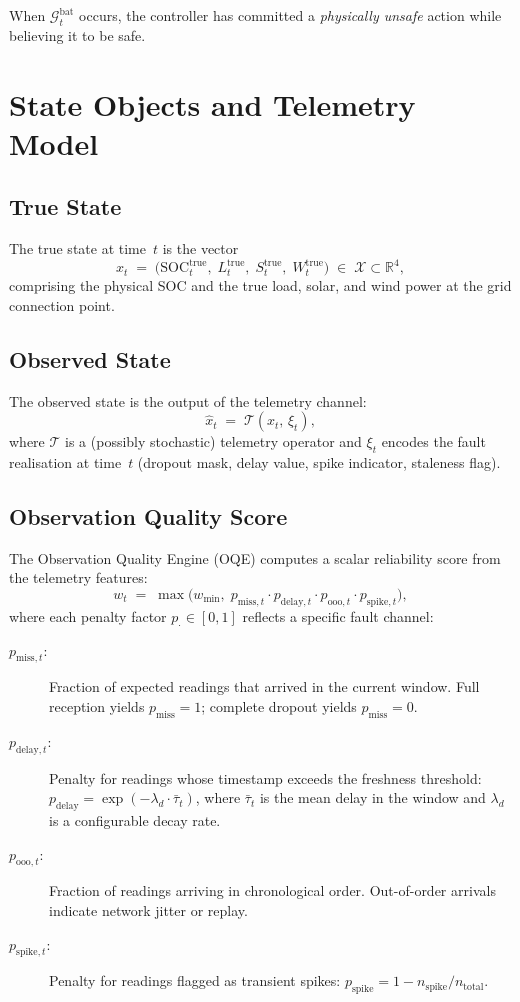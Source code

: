 When $\mathcal{G}_t^{\mathrm{bat}}$ occurs, the controller has committed
a \emph{physically unsafe} action while believing it to be safe.

\section{State Objects and Telemetry Model}

\subsection{True State}

The true state at time~$t$ is the vector
\[
  x_t \;=\; \bigl(\mathrm{SOC}_t^{\mathrm{true}},\;
  L_t^{\mathrm{true}},\; S_t^{\mathrm{true}},\; W_t^{\mathrm{true}}\bigr)
  \;\in\; \mathcal{X} \subset \mathbb{R}^4,
\]
comprising the physical SOC and the true load, solar, and wind power at
the grid connection point.

\subsection{Observed State}

The observed state is the output of the telemetry channel:
\[
  \hat{x}_t \;=\; \mathcal{T}(x_t,\, \xi_t),
\]
where $\mathcal{T}$ is a (possibly stochastic) telemetry operator and
$\xi_t$ encodes the fault realisation at time~$t$ (dropout mask, delay
value, spike indicator, staleness flag).

\subsection{Observation Quality Score}
\label{sec:oqe-formula}

The Observation Quality Engine (OQE) computes a scalar reliability
score from the telemetry features:
\[
  w_t \;=\; \max\!\bigl(w_{\min},\;
    p_{\mathrm{miss},t} \cdot p_{\mathrm{delay},t}
    \cdot p_{\mathrm{ooo},t} \cdot p_{\mathrm{spike},t}\bigr),
\]
where each penalty factor $p_{\cdot} \in [0, 1]$ reflects a specific
fault channel:

\begin{description}
  \item[$p_{\mathrm{miss},t}$:] Fraction of expected readings that
    arrived in the current window.  Full reception yields $p_{\mathrm{miss}} = 1$;
    complete dropout yields $p_{\mathrm{miss}} = 0$.
  \item[$p_{\mathrm{delay},t}$:] Penalty for readings whose timestamp
    exceeds the freshness threshold: $p_{\mathrm{delay}} =
    \exp(-\lambda_d \cdot \bar{\tau}_t)$, where $\bar{\tau}_t$ is the
    mean delay in the window and $\lambda_d$ is a configurable decay rate.
  \item[$p_{\mathrm{ooo},t}$:] Fraction of readings arriving in
    chronological order.  Out-of-order arrivals indicate network jitter
    or replay.
  \item[$p_{\mathrm{spike},t}$:] Penalty for readings flagged as
    transient spikes: $p_{\mathrm{spike}} = 1 - n_{\mathrm{spike}} /
    n_{\mathrm{total}}$.
\end{description}

